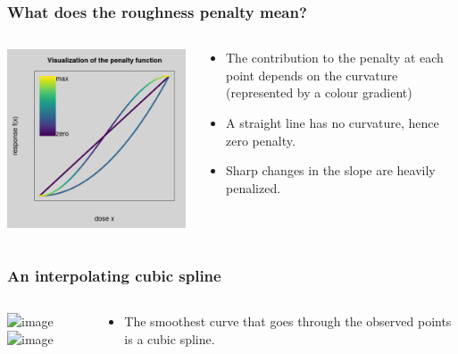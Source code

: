 \documentclass[aspectratio=169]{beamer}
\begin{document}
\begin{frame}
  \frametitle{What does the roughness penalty mean?}

   \begin{columns}
    \begin{column}{5cm}
      \includegraphics[scale=0.4]{figures/penalty2.png}
    \end{column}
    \begin{column}{6cm}
      \begin{itemize}
      \item The contribution to the penalty at each point depends on the
        curvature (represented by a colour gradient)
      \item A straight line has no curvature, hence zero penalty.
      \item Sharp changes in the slope are heavily penalized.
      \end{itemize}
    \end{column}
  \end{columns}

\end{frame}
    
\begin{frame}
  \frametitle{An interpolating cubic spline}

    \begin{columns}
    \begin{column}{6cm}
      \includegraphics<1>[scale=0.4]{figures/dose-response-points.png}
      \includegraphics<2>[scale=0.4]{figures/dose-response-cubic.png}
    \end{column}
    \begin{column}{6cm}
      \begin{itemize}
        \item The smoothest curve that goes through the observed
          points is a cubic spline.
      \end{itemize}
    \end{column}
  \end{columns}

\end{frame}
\end{document}
